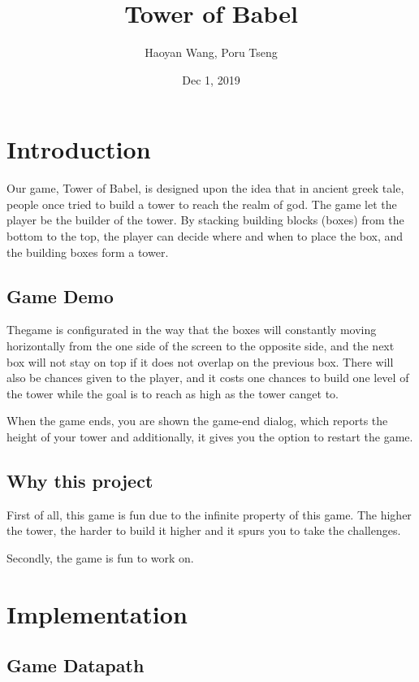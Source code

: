 \documentclass[12pt, draft]{report}
\title{Tower of Babel}
\author{Haoyan Wang, Poru Tseng}
\date{Dec 1, 2019}
\begin{document}
\maketitle
{}

\section*{Introduction}
Our game, Tower of Babel, is designed upon the idea that in ancient greek tale,
people once tried to build a tower to reach the realm of god. The game let the 
player be the builder of the tower. By stacking building blocks (boxes) from the
bottom to the top, the player can decide where and when to place the box, and the 
building boxes form a tower. 

\subsection*{Game Demo}
Thegame is configurated in the way that the boxes will constantly moving 
horizontally from the one side of the screen to the opposite side, and the next 
box will not stay on top if it does not overlap on the previous box. There will 
also be chances given to the player, and it costs one chances to build one level 
of the tower while the goal is to reach as high as the tower canget to.

When the game ends, you are shown the game-end dialog, which reports the 
height of your tower and additionally, it gives you the option to restart the game. 

\subsection*{Why this project}
First of all, this game is fun due to the infinite property of this game. The higher
the tower, the harder to build it higher and it spurs you to take the challenges.

Secondly, the game is fun to work on.

\pagebreak
\section*{Implementation}
\subsection*{Game Datapath}
\end{document}
